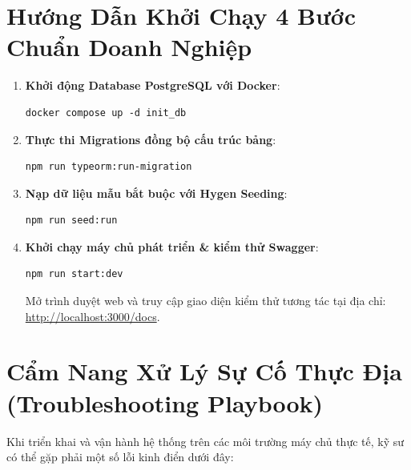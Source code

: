 \documentclass[12pt,a4paper,oneside]{book}
\begin{document}
\section{Hướng Dẫn Khởi Chạy 4 Bước Chuẩn Doanh Nghiệp}
\begin{enumerate}
  \item \textbf{Khởi động Database PostgreSQL với Docker}:
\begin{codebox}
\begin{Verbatim}[fontsize=\small]
docker compose up -d init_db
\end{Verbatim}
\end{codebox}
  \item \textbf{Thực thi Migrations đồng bộ cấu trúc bảng}:
\begin{codebox}
\begin{Verbatim}[fontsize=\small]
npm run typeorm:run-migration
\end{Verbatim}
\end{codebox}
  \item \textbf{Nạp dữ liệu mẫu bắt buộc với Hygen Seeding}:
\begin{codebox}
\begin{Verbatim}[fontsize=\small]
npm run seed:run
\end{Verbatim}
\end{codebox}
  \item \textbf{Khởi chạy máy chủ phát triển \& kiểm thử Swagger}:
\begin{codebox}
\begin{Verbatim}[fontsize=\small]
npm run start:dev
\end{Verbatim}
\end{codebox}
  Mở trình duyệt web và truy cập giao diện kiểm thử tương tác tại địa chỉ: \url{http://localhost:3000/docs}.
\end{enumerate}

\section{Cẩm Nang Xử Lý Sự Cố Thực Địa (Troubleshooting Playbook)}
Khi triển khai và vận hành hệ thống trên các môi trường máy chủ thực tế, kỹ sư có thể gặp phải một số lỗi kinh điển dưới đây:
\end{document}
